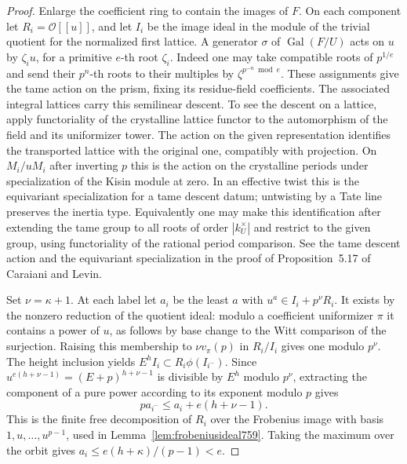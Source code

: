 \documentclass[a4paper,11pt]{article}
\theoremstyle{definition}
\theoremstyle{remark}
\numberwithin{equation}{section}
\begin{document}
\begin{proof}
Enlarge the coefficient ring to contain the images of \(F\).
On each component let \(R_i=\mathcal O[[u]]\), and let
\(I_i\) be the image ideal in the module of the trivial
quotient for the normalized first lattice. A generator
\(\sigma\) of \(\operatorname{Gal}(F/U)\) acts on \(u\)
by \(\zeta_i u\), for a primitive \(e\)-th root \(\zeta_i\).
Indeed one may take compatible roots of \(p^{1/e}\)
and send their \(p^n\)-th roots to their multiples by
\(\zeta^{p^{-n}\bmod e}\). These assignments give the tame
action on the prism, fixing its residue-field coefficients.
The associated integral lattices carry this semilinear
descent. To see the descent on a lattice, apply functoriality
of the crystalline lattice functor to the automorphism
of the field and its uniformizer tower. The action on
the given representation identifies the transported
lattice with the original one, compatibly with projection.
On \(M_i/uM_i\) after inverting \(p\) this is the action
on the crystalline periods under specialization of the
Kisin module at zero. In an effective twist this is the
equivariant specialization for a tame descent datum;
untwisting by a Tate line preserves the inertia type.
Equivalently one may make this identification after
extending the tame group to all roots of order
\(|k_U^\times|\) and restrict to the given group, using
functoriality of the rational period comparison.
See the tame descent action and the equivariant
specialization in the proof of Proposition~5.17 of
Caraiani and Levin.~\cite{III-II-tamedescent800}

Set \(\nu=\kappa+1\). At each label let \(a_i\) be the
least \(a\) with \(u^a\in I_i+p^\nu R_i\). It exists by
the nonzero reduction of the quotient ideal: modulo a
coefficient uniformizer \(\pi\) it contains a power of
\(u\), as follows by base change to the Witt comparison
of the surjection. Raising this membership to
\(\nu v_\pi(p)\) in \(R_i/I_i\) gives one modulo \(p^\nu\).
The height inclusion yields
\(E^h I_i\subset R_i\phi(I_{i^-})\).
Since \(u^{e(h+\nu-1)}=(E+p)^{h+\nu-1}\) is divisible
by \(E^h\) modulo \(p^\nu\), extracting the component of
a pure power according to its exponent modulo \(p\) gives
\[
                 p a_{i^-}\le a_i+e(h+\nu-1).
\]
This is the finite free decomposition of \(R_i\) over the
Frobenius image with basis \(1,u,\ldots,u^{p-1}\), used
in Lemma~\ref{lem:frobeniusideal759}. Taking the maximum
over the orbit gives \(a_i\le e(h+\kappa)/(p-1)<e\).


\end{proof}
\end{document}
